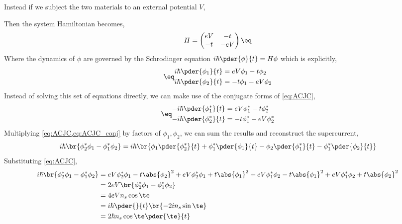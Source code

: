 \documentclass{article}
\begin{document}
Instead if we subject the two materials to an external potential $V$,
\begin{center}
\end{center}

Then the system Hamiltonian becomes,
\[ H = \begin{pmatrix}
    e V & - t \\
    -t & - e V
\end{pmatrix} \eq \label{eq:ACJC_H} \]
Where the dynamics of $\phi$ are governed by the Schrodinger equation $i \hbar \pder{\phi}{t} = H \phi$ which is explicitly,
\begin{align*}
\eq\label{eq:ACJC}
\begin{split}
    i\hbar \pder{\phi_1}{t} &= e V \phi_1 - t \phi_2 \\
    i\hbar \pder{\phi_2}{t} &= - t \phi_1 - e V \phi_2
\end{split}
\end{align*}
Instead of solving this set of equations directly, we can make use of the conjugate forms of \cref{eq:ACJC},
\begin{align*}
\eq\label{eq:ACJC_conj}
\begin{split}
    -i\hbar \pder{\phi_1^*}{t} &= e V \phi_1^* - t \phi_2^* \\
    -i\hbar \pder{\phi_2^*}{t} &= - t \phi_1^* - e V \phi_2^*
\end{split}
\end{align*}
Multiplying \cref{eq:ACJC,eq:ACJC_conj} by factors of $\phi_1, \phi_2$, we can sum the results and reconstruct the supercurrent,
\[ i\hbar \br{\phi_2^* \phi_1 - \phi_1^* \phi_2} = i \hbar \br{\phi_1 \pder{\phi_2^*}{t} + \phi_1^* \pder{\phi_1}{t} - \phi_2 \pder{\phi_1^*}{t} - \phi_1^* \pder{\phi_2}{t}}\]
Substituting \cref{eq:ACJC},
\begin{align*}
    i\hbar \br{\phi_2^* \phi_1 - \phi_1^* \phi_2}
    &= eV \phi_2^* \phi_1 - t \abs{\phi_2}^2 + e V \phi_2^* \phi_1 + t \abs{\phi_1}^2 + eV \phi_1^* \phi_2 - t \abs{\phi_1}^2 + e V \phi_1^* \phi_2 + t \abs{\phi_2}^2 \\
    &= 2 e V \br{\phi_2^* \phi_1 - \phi_1^* \phi_2} \\
    &= 4 e V n_s \cos \te \\
    &= i \hbar \pder{}{t}\br{-2 i n_s \sin \te} \\
    &= 2 \hbar n_s \cos \te \pder{\te}{t}
\end{align*}
\end{document}
